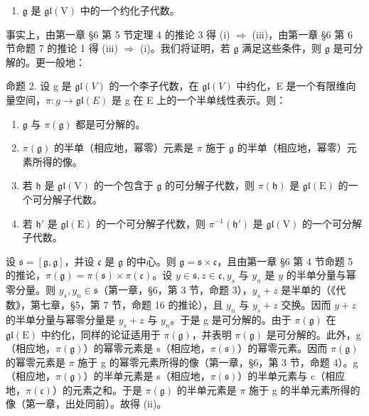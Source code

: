 \begin{enumerate}
\def\labelenumi{(\roman{enumi})}
\setcounter{enumi}{2}
\tightlist
\item
  \(\mathfrak{g}\) 是 \(\mathfrak{gl}(\mathrm{V})\) 中的一个约化子代数。
\end{enumerate}

事实上，由第一章 §6 第 5 节定理 4 的推论 3 得 (i) \(\Longrightarrow\) (iii)，由第一章 §6 第 6 节命题 7 的推论 1 得 (iii) \(\Longrightarrow\) (i)。我们将证明，若 \(\mathfrak{g}\) 满足这些条件，则 \(\mathfrak{g}\) 是可分解的。更一般地：

命题 2. 设 g 是 \(\mathfrak{gl}(V)\) 的一个李子代数，在 \(\mathfrak{gl}(V)\) 中约化，E 是一个有限维向量空间，\(\pi : g \to \mathfrak{gl}(E)\) 是 g 在 E 上的一个半单线性表示。则：

\begin{enumerate}
\def\labelenumi{(\roman{enumi})}
\item
  \(\mathfrak{g}\) 与 \(\pi (\mathfrak{g})\) 都是可分解的。
\item
  \(\pi(\mathfrak{g})\) 的半单（相应地，幂零）元素是 \(\pi\) 施于 \(\mathfrak{g}\) 的半单（相应地，幂零）元素所得的像。
\item
  若 \(\mathfrak{h}\) 是 \(\mathfrak{gl}(\mathrm{V})\) 的一个包含于 \(\mathfrak{g}\) 的可分解子代数，则 \(\pi(\mathfrak{h})\) 是 \(\mathfrak{gl}(\mathrm{E})\) 的一个可分解子代数。
\item
  若 \(\mathfrak{h}'\) 是 \(\mathfrak{gl}(\mathrm{E})\) 的一个可分解子代数，则 \(\pi^{-1}(\mathfrak{h}')\) 是 \(\mathfrak{gl}(\mathrm{V})\) 的一个可分解子代数。
\end{enumerate}

设 \(\mathfrak{s} = [\mathfrak{g},\mathfrak{g}]\)，并设 \(\mathfrak{c}\) 是 \(\mathfrak{g}\) 的中心。则 \(\mathfrak{g} = \mathfrak{s} \times \mathfrak{c}\)，且由第一章 §6 第 4 节命题 5 的推论，\(\pi(\mathfrak{g}) = \pi(\mathfrak{s}) \times \pi(\mathfrak{c})\)。设 \(y \in \mathfrak{s}, z \in \mathfrak{c}, y_s\) 与 \(y_n\) 是 \(y\) 的半单分量与幂零分量。则 \(y_s, y_n \in \mathfrak{s}\)（第一章，§6，第 3 节，命题 3），\(y_s + z\) 是半单的（《代数》，第七章，§5，第 7 节，命题 16 的推论），且 \(y_n\) 与 \(y_s + z\) 交换。因而 \(y + z\) 的半单分量与幂零分量是 \(y_{s} + z\) 与 \(y_{n}\)。于是 g 是可分解的。由于 \(\pi(\mathfrak{g})\) 在 \(\mathfrak{gl}(\mathrm{E})\) 中约化，同样的论证适用于 \(\pi(\mathfrak{g})\)，并表明 \(\pi(\mathfrak{g})\) 是可分解的。此外，g（相应地，\(\pi(\mathfrak{g})\)）的幂零元素是 s（相应地，\(\pi(\mathfrak{s})\)）的幂零元素。因而 \(\pi(\mathfrak{g})\) 的幂零元素是 \(\pi\) 施于 g 的幂零元素所得的像（第一章，§6，第 3 节，命题 4）。g（相应地，\(\pi(\mathfrak{g})\)）的半单元素是 s（相应地，\(\pi(\mathfrak{s})\)）的半单元素与 c（相应地，\(\pi(\mathfrak{c})\)）的元素之和。于是 \(\pi(\mathfrak{g})\) 的半单元素是 \(\pi\) 施于 g 的半单元素所得的像（第一章，出处同前）。故得 (ii)。

